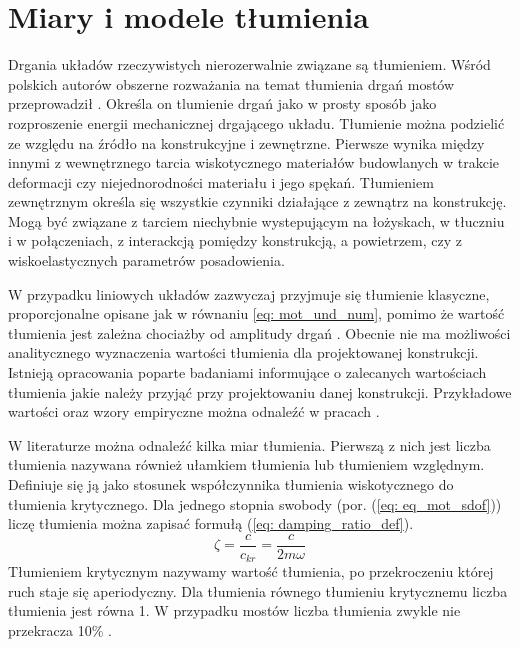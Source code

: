 \section{Miary i modele tłumienia}
Drgania układów rzeczywistych nierozerwalnie związane są tłumieniem. Wśród polskich autorów obszerne rozważania na temat tłumienia drgań mostów przeprowadził \cite{Salamak2003}. Określa on tlumienie drgań jako w prosty sposób jako rozproszenie energii mechanicznej drgającego układu. Tłumienie można podzielić ze względu na źródło na konstrukcyjne i zewnętrzne. Pierwsze wynika między innymi z wewnętrznego tarcia wiskotycznego materiałów budowlanych w trakcie deformacji czy niejednorodności materiału i jego spękań. Tłumieniem zewnętrznym określa się wszystkie czynniki działające z zewnątrz na konstrukcję. Mogą być związane z tarciem niechybnie wystepującym na łożyskach, w tłuczniu i w połączeniach, z interackcją pomiędzy konstrukcją, a powietrzem, czy z wiskoelastycznych parametrów posadowienia.

W przypadku liniowych układów zazwyczaj przyjmuje się tłumienie klasyczne, proporcjonalne opisane jak w równaniu \ref{eq: mot_und_num}, pomimo że wartość tłumienia jest zależna chociażby od amplitudy drgań \parencite{Ladislav1996}. Obecnie nie ma możliwości analitycznego wyznaczenia wartości tłumienia dla projektowanej konstrukcji. Istnieją opracowania poparte badaniami informujące o zalecanych wartościach tłumienia jakie należy przyjąć przy projektowaniu danej konstrukcji. Przykładowe wartości oraz wzory empiryczne można odnaleźć w pracach \parencite{Salamak2003, Fryba1999,Bachmann2012,Yamaguchi1997}. 

W literaturze można odnaleźć kilka miar tłumienia. Pierwszą z nich jest liczba tłumienia  nazywana również ułamkiem tłumienia lub tłumieniem względnym. Definiuje się ją jako stosunek współczynnika tłumienia wiskotycznego do tłumienia krytycznego. Dla jednego stopnia swobody (por. (\ref{eq: eq_mot_sdof})) liczę tłumienia można zapisać formułą (\ref{eq: damping_ratio_def}).
\begin{equation} \label{eq: damping_ratio_def}
	\zeta = \frac{c}{c_{kr}}=\frac{c}{2m\omega}
\end{equation}
Tłumieniem krytycznym nazywamy wartość tłumienia, po przekroczeniu której ruch staje się aperiodyczny. Dla tłumienia równego tłumieniu krytycznemu liczba tłumienia jest równa 1. W przypadku mostów liczba tłumienia zwykle nie przekracza 10\% \parencite{Salamak2003}. 

